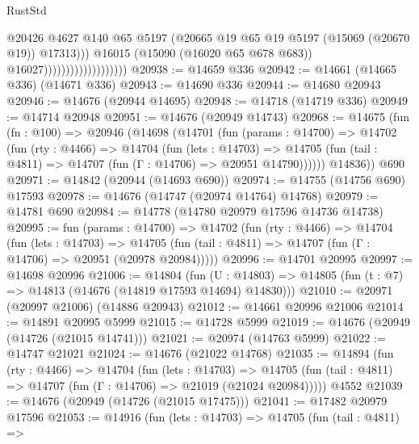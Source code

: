 \begin{lexlean}{RustStd}
\begin{coremodule}
                                              @20426
                                              @4627
                                              @140
                                              @65
                                              @5197
                                              (@20665
                                                @19
                                                @65
                                                @19
                                                @5197
                                                (@15069 (@20670 @19))
                                                @17313)))
                                          @16015
                                          (@15090 (@16020 @65 @678 @683))
                                          @16027)))))))))))))))))))
@20938 := @14659 @336
@20942 := @14661 (@14665 @336) (@14671 @336)
@20943 := @14690 @336
@20944 := @14680 @20943
@20946 := @14676 (@20944 @14695)
@20948 := @14718 (@14719 @336)
@20949 := @14714 @20948
@20951 := @14676 (@20949 @14743)
@20968 := @14675
    (fun (fn : @100) =>
    @20946
      (@14698
        (@14701
          (fun (params : @14700) =>
          @14702
            (fun (rty : @4466) =>
            @14704
              (fun (lets : @14703) =>
              @14705 (fun (tail : @4811) => @14707 (fun (Γ : @14706) => @20951 @14790))))))
        @14836))
    @690
@20971 := @14842 (@20944 (@14693 @690))
@20974 := @14755 (@14756 @690) @17593
@20978 := @14676 (@14747 (@20974 @14764) @14768)
@20979 := @14781 @690
@20984 := @14778 (@14780 @20979 @17596 @14736 @14738)
@20995 := fun (params : @14700) =>
  @14702
    (fun (rty : @4466) =>
    @14704
      (fun (lets : @14703) =>
      @14705 (fun (tail : @4811) => @14707 (fun (Γ : @14706) => @20951 (@20978 @20984)))))
@20996 := @14701 @20995
@20997 := @14698 @20996
@21006 := @14804
    (fun (U : @14803) => @14805 (fun (t : @7) => @14813 (@14676 (@14819 @17593 @14694) @14830)))
@21010 := @20971 (@20997 @21006) (@14886 @20943)
@21012 := @14661 @20996 @21006
@21014 := @14891 @20995 @5999
@21015 := @14728 @5999
@21019 := @14676 (@20949 (@14726 (@21015 @14741)))
@21021 := @20974 (@14763 @5999)
@21022 := @14747 @21021
@21024 := @14676 (@21022 @14768)
@21035 := @14894
    (fun (rty : @4466) =>
    @14704
      (fun (lets : @14703) =>
      @14705 (fun (tail : @4811) => @14707 (fun (Γ : @14706) => @21019 (@21024 @20984)))))
    @4552
@21039 := @14676 (@20949 (@14726 (@21015 @17475)))
@21041 := @17482 @20979 @17596
@21053 := @14916
    (fun (lets : @14703) =>
    @14705
      (fun (tail : @4811) =>

\end{coremodule}
\end{lexlean}
